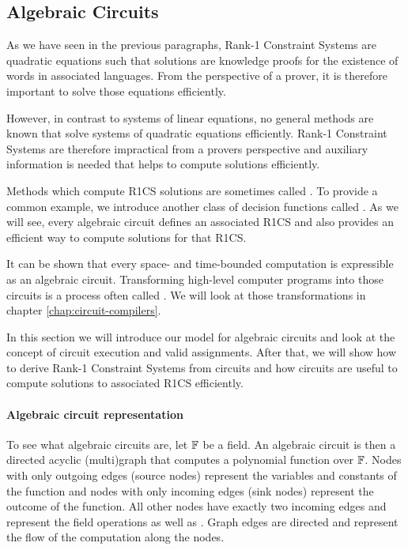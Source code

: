 \subsection{Algebraic Circuits}
\label{sec:circuits} As we have seen in the previous paragraphs, Rank-1 Constraint Systems are quadratic equations such that solutions are knowledge proofs for the existence of words in associated languages. From the perspective of a prover, it is therefore important to solve those equations efficiently. 

However,  in contrast to systems of linear equations, no general methods are known that solve systems of quadratic equations efficiently. Rank-1 Constraint Systems are therefore impractical from a provers perspective and auxiliary information is needed that helps to compute solutions efficiently.

Methods which compute R1CS solutions are sometimes called .  To provide a common example, we introduce another class of decision functions called . As we will see, every algebraic circuit defines an associated R1CS and also provides an efficient way to compute solutions for that R1CS.

It can be shown that every space- and time-bounded computation is expressible as an algebraic circuit. Transforming high-level computer programs into those circuits is a process often called . We will look at those transformations in chapter \ref{chap:circuit-compilers}.

In this section we will introduce our model for algebraic circuits and look at the concept of circuit execution and valid assignments. After that, we will show how to derive Rank-1 Constraint Systems from circuits and how circuits are useful to compute solutions to associated R1CS efficiently.
\paragraph{Algebraic circuit representation} To see what algebraic circuits are, let $\mathbb{F}$ be a field. An algebraic circuit is then a directed acyclic (multi)graph that computes a polynomial function over $\mathbb{F}$. Nodes with only outgoing edges (source nodes) represent the variables and constants of the function and nodes with only incoming edges (sink nodes) represent the outcome of the function. All other nodes have exactly two incoming edges and represent the field operations  as well as . Graph edges are directed and represent the flow of the computation along the nodes.


